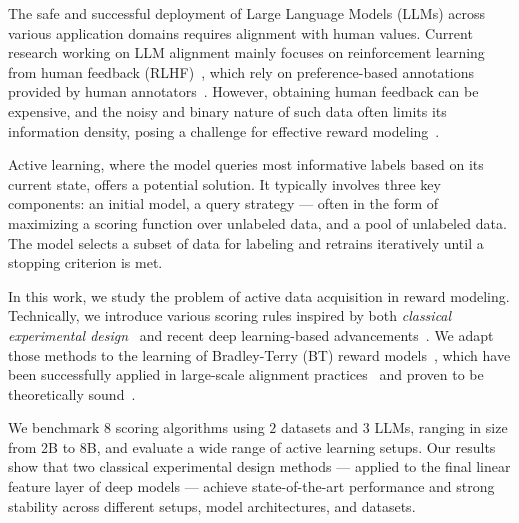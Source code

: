 The safe and successful deployment of Large Language Models (LLMs) across various application domains requires alignment with human values. Current research working on LLM alignment mainly focuses on reinforcement learning from human feedback (RLHF)~\citep{christiano2017deep,stiennon2020learning,ouyang2022training,bai2022training}, which rely on preference-based annotations provided by human annotators~\citep{bai2022constitutional}. However, obtaining human feedback can be expensive, and the noisy and binary nature of such data often limits its information density, posing a challenge for effective reward modeling~\citep{wang2024secrets,liu2024skywork}.

Active learning, where the model queries most informative labels based on its current state, offers a potential solution. It typically involves three key components: an initial model, a query strategy --- often in the form of maximizing a scoring function over unlabeled data, and a pool of unlabeled data. The model selects a subset of data for labeling and retrains iteratively until a stopping criterion is met.

In this work, we study the problem of active data acquisition in reward modeling. 
Technically, we introduce various scoring rules inspired by both \textit{classical experimental design}~\citep{chaloner1995bayesian} and recent deep learning-based advancements~\citep{sener2017active, houlsby2011bayesian, kirsch2019batchbald}. We adapt those methods to the learning of Bradley-Terry (BT) reward models~\citep{bradley1952rank}, which have been successfully applied in large-scale alignment practices~\citep{ouyang2022training, touvron2023llama} and proven to be theoretically sound~\citep{sun2024rethinking}.

We benchmark $8$ scoring algorithms using $2$ datasets and $3$ LLMs, ranging in size from 2B to 8B, and evaluate a wide range of active learning setups. Our results show that two classical experimental design methods --- applied to the final linear feature layer of deep models --- achieve state-of-the-art performance and strong stability across different setups, model architectures, and datasets.

